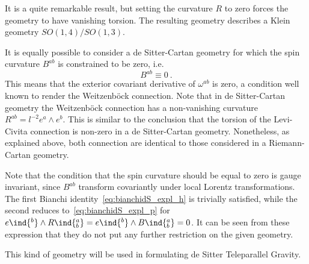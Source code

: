 \documentclass[11pt]{article}
\begin{document}
\begin{remark}
	It is a quite remarkable result, but setting the curvature $R$ 
	to zero forces the geometry to have vanishing torsion. The 
	resulting geometry describes a Klein geometry 
	$SO(1,4)/SO(1,3)$.
\end{remark}

\begin{remark}
	It is equally possible to consider a de Sitter-Cartan geometry 
	for which the spin curvature $B^{ab}$ is constrained to be 
	zero, i.e.
	\begin{displaymath}
		B^{ab} \equiv 0~.
	\end{displaymath}
	This means that the exterior covariant derivative of 
	$\omega^{ab}$ is zero, a condition well known to render the 
	Weitzenb\"ock connection. Note that in de Sitter-Cartan 
	geometry the Weitzenb\"ock connection has a non-vanishing 
	curvature $R^{ab} = l^{-2} e^a \wedge e^b$. This is similar to 
	the conclusion that the torsion of the Levi-Civita connection 
	is non-zero in a de Sitter-Cartan geometry. Nonetheless, as 
	explained above, both connection are identical to those 
	considered in a Riemann-Cartan geometry.
	
	Note that the condition that the spin curvature should be 
	equal to zero is gauge invariant, since $B^{ab}$ transform 
	covariantly under local Lorentz transformations. The first 
	Bianchi identity~\eqref{eq:bianchidS_expl_h} is trivially 
	satisfied, while the second reduces 
	to~\eqref{eq:bianchidS_expl_p} for $e\ind{^b} \wedge 
	R\ind{_b^a} = e\ind{^b} \wedge B\ind{_b^a} = 0$. It can be 
	seen from these expression that they do not put any further 
	restriction on the given geometry.

	This kind of geometry will be used in formulating de Sitter 
	Teleparallel Gravity.
\end{remark}


%


\end{document}
